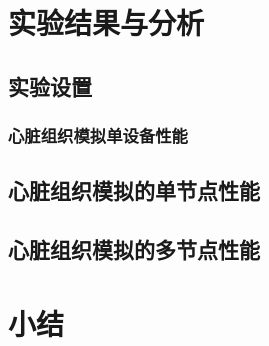 \section{实验结果与分析}
\subsection{实验设置}

\subsubsection{心脏组织模拟单设备性能}

\subsection{心脏组织模拟的单节点性能}

\subsection{心脏组织模拟的多节点性能}

\section{小结}
